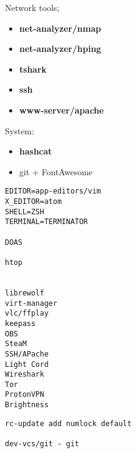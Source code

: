 \documentclass[10pt, a4paper, onecolumn, openany]{book}         %
\begin{document}
%

Network tools;
\begin{itemize}
    \item \textbf{net-analyzer/nmap}
    \item \textbf{net-analyzer/hping}
    \item \textbf{tshark}
    \item \textbf{ssh}
    \item \textbf{www-server/apache}
    
\end{itemize}



System:
\begin{itemize}


    \item \textbf{hashcat}
    \item git + FontAwesome
\end{itemize}



\begin{Verbatim}[commandchars=\\\{\}]
EDITOR=app-editors/vim
X_EDITOR=atom
SHELL=ZSH
TERMINAL=TERMINATOR

DOAS

htop


librewolf
virt-manager
vlc/ffplay
keepass
OBS
SteaM
SSH/APache
Light Cord
Wireshark
Tor
ProtonVPN
Brightness
\end{Verbatim}

\begin{Verbatim}[commandchars=\\\{\}]
rc-update add numlock default

dev-vcs/git - git
\end{Verbatim}
\end{document}

